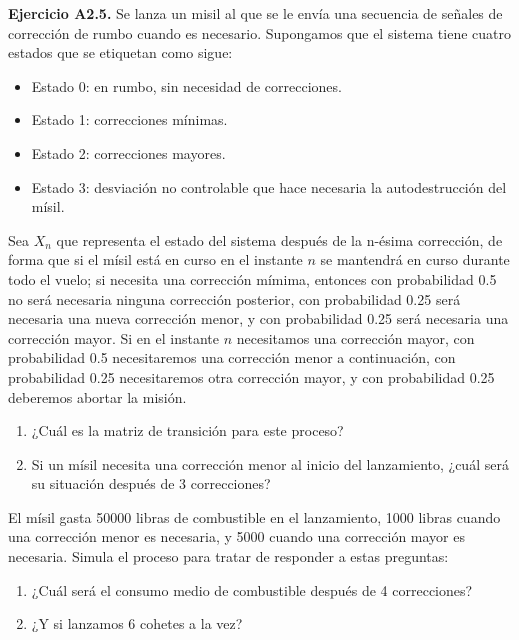 \documentclass[
]{book}
\providecommand{\tightlist}{%
  \setlength{\itemsep}{0pt}\setlength{\parskip}{0pt}}
\theoremstyle{definition}
\theoremstyle{definition}
\theoremstyle{definition}
\theoremstyle{definition}
\theoremstyle{remark}
\begin{document}
\textbf{Ejercicio A2.5.} Se lanza un misil al que se le envía una secuencia de señales de corrección de rumbo cuando es necesario. Supongamos que el sistema tiene cuatro estados que se etiquetan como sigue:

\begin{itemize}
\tightlist
\item
  Estado 0: en rumbo, sin necesidad de correcciones.
\item
  Estado 1: correcciones mínimas.
\item
  Estado 2: correcciones mayores.
\item
  Estado 3: desviación no controlable que hace necesaria la autodestrucción del mísil.
\end{itemize}

Sea \(X_n\) que representa el estado del sistema después de la n-ésima corrección, de forma que si el mísil está en curso en el instante \(n\) se mantendrá en curso durante todo el vuelo; si necesita una corrección mímima, entonces con probabilidad 0.5 no será necesaria ninguna corrección posterior, con probabilidad 0.25 será necesaria una nueva corrección menor, y con probabilidad 0.25 será necesaria una corrección mayor. Si en el instante \(n\) necesitamos una corrección mayor, con probabilidad 0.5 necesitaremos una corrección menor a continuación, con probabilidad 0.25 necesitaremos otra corrección mayor, y con probabilidad 0.25 deberemos abortar la misión.

\begin{enumerate}
\def\labelenumi{\arabic{enumi}.}
\tightlist
\item
  ¿Cuál es la matriz de transición para este proceso?
\item
  Si un mísil necesita una corrección menor al inicio del lanzamiento, ¿cuál será su situación después de 3 correcciones?
\end{enumerate}

El mísil gasta 50000 libras de combustible en el lanzamiento, 1000 libras cuando una corrección menor es necesaria, y 5000 cuando una corrección mayor es necesaria. Simula el proceso para tratar de responder a estas preguntas:

\begin{enumerate}
\def\labelenumi{\arabic{enumi}.}
\setcounter{enumi}{2}
\tightlist
\item
  ¿Cuál será el consumo medio de combustible después de 4 correcciones?
\item
  ¿Y si lanzamos 6 cohetes a la vez?
\end{enumerate}
\end{document}
